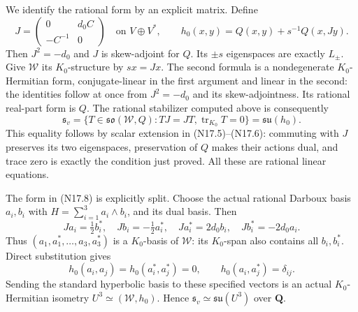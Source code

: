 We identify the rational form by an explicit matrix. Define
\begin{equation}
 J=\begin{pmatrix}0&d_0C\\-C^{-1}&0\end{pmatrix}
       \quad\text{on }V\oplus V^*,\qquad
 h_0(x,y)=Q(x,y)+s^{-1}Q(x,Jy).                       \tag{N17.8}
\end{equation}
Then $J^2=-d_0$ and $J$ is skew-adjoint for $Q$. Its
$\pm s$ eigenspaces are exactly $L_\pm$.
Give $\mathcal W$ its $K_0$-structure by $sx=Jx$.
The second formula is a nondegenerate $K_0$-Hermitian form,
conjugate-linear in the first argument and linear in the second:
the identities follow at once from $J^2=-d_0$ and its
skew-adjointness. Its rational real-part form is $Q$.
The rational stabilizer computed above is consequently
\begin{equation}
 \mathfrak s_v=
 \{T\in\mathfrak{so}(\mathcal W,Q):TJ=JT,
                         \operatorname{tr}_{K_0}T=0\}
                       =\mathfrak{su}(h_0).           \tag{N17.9}
\end{equation}
This equality follows by scalar extension in (N17.5)--(N17.6):
commuting with $J$ preserves its two eigenspaces, preservation
of $Q$ makes their actions dual, and trace zero is exactly the
condition just proved. All these are rational linear equations.

The form in (N17.8) is explicitly split. Choose the actual
rational Darboux basis $a_i,b_i$ with
$H=\sum_{i=1}^3a_i\wedge b_i$, and its dual basis. Then
\[
 J a_i=\tfrac12 b_i^*,\quad
 J b_i=-\tfrac12 a_i^*,\quad
 J a_i^*=2d_0b_i,\quad J b_i^*=-2d_0a_i.
\]
Thus $(a_1,a_1^*,\ldots,a_3,a_3^*)$ is a $K_0$-basis
of $\mathcal W$: its $K_0$-span also contains all $b_i,b_i^*$.
Direct substitution gives
\[
 h_0(a_i,a_j)=h_0(a_i^*,a_j^*)=0,\qquad
 h_0(a_i,a_j^*)=\delta_{ij}.
\]
Sending the standard hyperbolic basis to these specified
vectors is an actual $K_0$-Hermitian isometry
$U^3\simeq(\mathcal W,h_0)$. Hence
$\mathfrak s_v\simeq\mathfrak{su}(U^3)$ over $\mathbf Q$.


